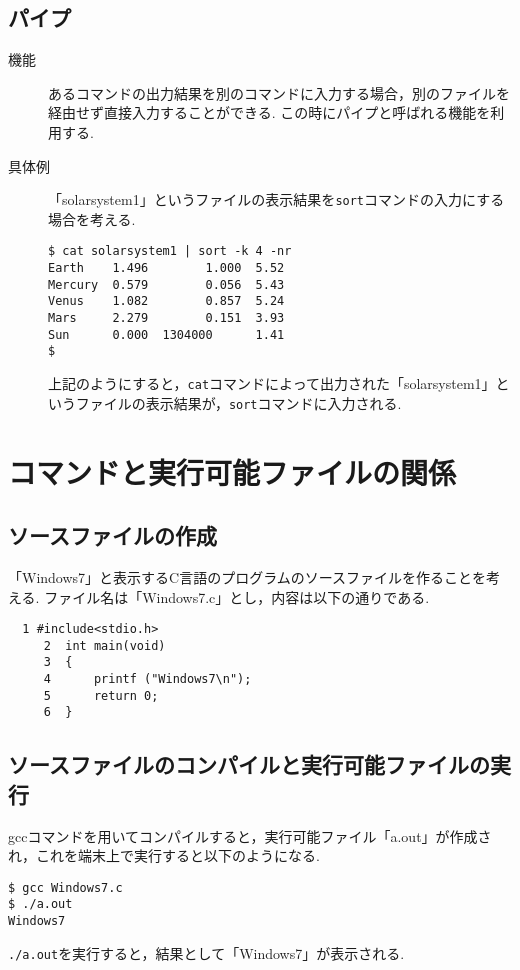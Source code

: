 \documentclass[a4j,11pt]{jarticle}
\begin{document}
\subsection{パイプ}
\begin{description}
  \item[機能]
あるコマンドの出力結果を別のコマンドに入力する場合，別のファイルを経由せず直接入力することができる. この時にパイプと呼ばれる機能を利用する.
  \item[具体例]
「solarsystem1」というファイルの表示結果を\verb|sort|コマンドの入力にする場合を考える.
    \begin{verbatim}
$ cat solarsystem1 | sort -k 4 -nr
Earth    1.496        1.000  5.52
Mercury  0.579        0.056  5.43
Venus    1.082        0.857  5.24
Mars     2.279        0.151  3.93
Sun      0.000  1304000      1.41
$
    \end{verbatim}
上記のようにすると，\verb|cat|コマンドによって出力された「solarsystem1」というファイルの表示結果が，\verb|sort|コマンドに入力される.
\end{description}

\section{コマンドと実行可能ファイルの関係}
\subsection{ソースファイルの作成}
\begin{description}
\item「Windows7」と表示するC言語のプログラムのソースファイルを作ることを考える.
ファイル名は「Windows7.c」とし，内容は以下の通りである.
\begin{verbatim}
  1	#include<stdio.h>
     2	int main(void)
     3	{
     4	    printf ("Windows7\n");
     5	    return 0;
     6	}
\end{verbatim}
\end{description}
\subsection{ソースファイルのコンパイルと実行可能ファイルの実行}
\begin{description}
\item gccコマンドを用いてコンパイルすると，実行可能ファイル「a.out」が作成され，これを端末上で実行すると以下のようになる.
\begin{verbatim}
$ gcc Windows7.c
$ ./a.out
Windows7
\end{verbatim}
\verb|./a.out|を実行すると，結果として「Windows7」が表示される.
\end{description}
\end{document}
